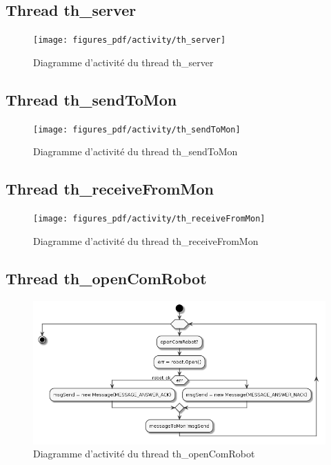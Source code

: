 \documentclass[11pt,a4paper]{paper}
\begin{document}
\subsection{Thread th\_server}

 \begin{figure}[htbp]
\begin{center}
\texttt{[image: figures\_pdf/activity/th\_server]}
\end{center}
\caption{Diagramme d'activité du thread th\_server}
\end{figure}
\FloatBarrier

\subsection{Thread th\_sendToMon}

 \begin{figure}[htbp]
\begin{center}
\texttt{[image: figures\_pdf/activity/th\_sendToMon]}
\end{center}
\caption{Diagramme d'activité du thread th\_sendToMon}
\end{figure}
\FloatBarrier


\subsection{Thread th\_receiveFromMon}

 \begin{figure}[htbp]
\begin{center}
\texttt{[image: figures\_pdf/activity/th\_receiveFromMon]}
\end{center}
\caption{Diagramme d'activité du thread th\_receiveFromMon}
\end{figure}
\FloatBarrier

\subsection{Thread th\_openComRobot}

 \begin{figure}[htbp]
\begin{center}
\includegraphics[scale=0.4]{figures_pdf/activity/th_openComRobot}
\end{center}
\caption{Diagramme d'activité du thread th\_openComRobot}
\end{figure}
\FloatBarrier
\end{document}
